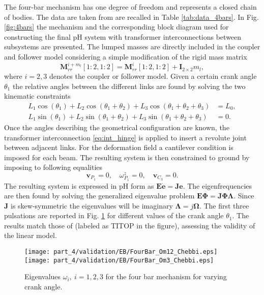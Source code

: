 The four-bar mechanism has one degree of freedom and represents a closed chain of bodies. The data are taken from \cite{kitis1990natural,chebbi2017} are recalled in Table \ref{tab:data_4bars}. In Fig. \ref{fig:4bars} the mechanism and the corresponding block diagram used for constructing the final pH system with transformer interconnections between subsystems are presented. The lumped masses are directly included in the coupler and follower model considering a simple modification of the rigid mass matrix
\begin{equation*}
\mathbf{M}_{rr}^{i + m_l}[1:2,1:2] = \mathbf{M}_{rr}^{i}[1:2,1:2] + \mathbf{I}_{2\times 2} m_l,
\end{equation*} 
where $i=2,3$ denotes the coupler or follower model. Given a certain crank angle $\theta_1$ the relative angles between the different links are found by solving the two kinematic constraints
\begin{align*}
L_1 \cos(\theta_1)+ L_2 \cos(\theta_1+\theta_2)+ L_3 \cos(\theta_1+\theta_2+\theta_3) &=L_0, \\
L_1 \sin(\theta_1)+L_2 \sin(\theta_1+\theta_2)+L_3 \sin(\theta_1+\theta_2+\theta_3) &=0.
\end{align*} 
Once the angles describing the geometrical configuration are known, the transformer interconnection \eqref{eq:int_hinge} is applied to insert a revolute joint between adjacent links. For the deformation field a cantilever condition is imposed for each beam. The resulting system is then constrained to ground by imposing to following equalities
\begin{equation*}
\mathbf{v}_{P_1} = 0, \quad \omega^z_{P_1} = 0, \quad \mathbf{v}_{C_3} = 0.
\end{equation*}
The resulting system is expressed in pH form as $\mathbf{E}\dot{\mathbf{e}} = \mathbf{J} \mathbf{e}$. The eigenfrequencies are then found by solving the generalized eigenvalue problem $\mathbf{E}\bm{\Phi} = \mathbf{J} \bm{\Phi \Lambda}$. Since $\mathbf{J}$ is skew-symmetric the eigenvalues will be imaginary $\bm{\Lambda} = j \bm{\Omega}$. The first three pulsations  are reported in Fig. \ref{fig:omega_4bars} for different values of the crank angle $\theta_1$. The results match those of \cite{chebbi2017} (labeled as TITOP in the figure), assessing the validity of the linear model.

\begin{figure}[tb]
	\centering
	\texttt{[image: part\_4/validation/EB/FourBar\_Om12\_Chebbi.eps]} 
	\texttt{[image: part\_4/validation/EB/FourBar\_Om3\_Chebbi.eps]} 
	\caption{Eigenvalues $\omega_i, \ i=1,2,3$ for the four bar mechanism for varying crank angle.}
	\label{fig:omega_4bars}
\end{figure}

